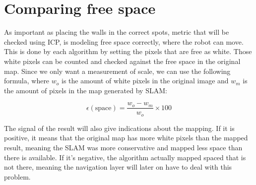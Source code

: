 \section{Comparing free space} \label{sec:free_space}

As important as placing the walls in the correct spots, metric that will be checked using ICP, is modeling free space correctly, where the robot can move. This is done by each algorithm by setting the pixels that are free as white. Those white pixels can be counted and checked against the free space in the original map. Since we only want a measurement of scale, we can use the following formula, where $w_o$ is the amount of white pixels in the original image and $w_m$ is the amount of pixels in the map generated by SLAM:

\begin{equation}
\epsilon(\text{space}) = \frac{w_o - w_m}{w_o} \times 100
\end{equation}

The signal of the result will also give indications about the mapping. If it is positive, it means that the original map has more white pixels than the mapped result, meaning the SLAM was more conservative and mapped less space than there is available. If it's negative, the algorithm actually mapped spaced that is not there, meaning the navigation layer will later on have to deal with this problem.